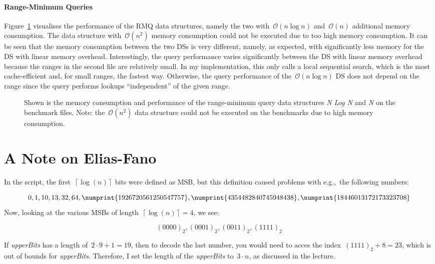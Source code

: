 \documentclass[a4paper,UKenglish,cleveref, autoref, thm-restate]{lipics-v2021}
\newcommand{\eg}{e.g.,\xspace~}
\begin{document}
	\paragraph*{Range-Minimum Queries}
	Figure~\ref{fig:rmq} visualises the performance of the RMQ data structures, namely the two with~$\mathcal{O}\left(n \log n\right)$ and~$\mathcal{O}\left(n\right)$ additional memory consumption. The data structure with~$\mathcal{O}\left(n^2\right)$ memory consumption could not be executed due to too high memory consumption. It can be seen that the memory consumption between the two DSs is very different, namely, as expected, with significantly less memory for the DS with linear memory overhead. Interestingly, the query performance varies significantly between the DS with linear memory overhead because the ranges in the second file are relatively small. In my implementation, this only calls a local sequential search, which is the most cache-efficient and, for small ranges, the fastest way. Otherwise, the query performance of the~$\mathcal{O}\left(n \log n\right)$ DS does not depend on the range since the query performs lookups ``independent'' of the given range.
	\begin{figure}[htbp]
		\begin{center}
			\resizebox{.9\linewidth}{!}{
				
			}
			\caption{Shown is the memory consumption and performance of the range-minimum query data structures \textit{N Log N} and \textit{N} on the benchmark files. Note: the~$\mathcal{O}\left(n^2\right)$ data structure could not be executed on the benchmarks due to high memory consumption.}
			\label{fig:rmq}
		\end{center}
	\end{figure}
	
	
	
	\appendix
	\section{A Note on Elias-Fano}
	\label{app:sec::ef}
	In the script, the first~$\left\lceil \log\left(n\right)\right\rceil$ bits were defined as MSB, but this definition caused problems with \eg the following numbers:
	
	\begin{equation*}
		0, 1, 10, 13, 32, 64, \numprint{1926720561250547757}, \numprint{4354482840745948438}, \numprint{18446013172173323708}
	\end{equation*}
	Now, looking at the various MSBs of length~$\left\lceil \log\left(n\right)\right\rceil = 4$, we see:
	
	\begin{equation}
		\left(0000\right)_2, \left(0001\right)_2, \left(0011\right)_2, \left(1111\right)_2
	\end{equation}
	
	If \textit{upperBits} has a length of~$2\cdot9+1 = 19$, then to decode the last number, you would need to acces the index~$\left(1111\right)_2 + 8 = 23$, which is out of bounds for \textit{upperBits}. Therefore, I set the length of the \textit{upperBits} to~$3 \cdot n$, as discussed in the lecture.
\end{document}
